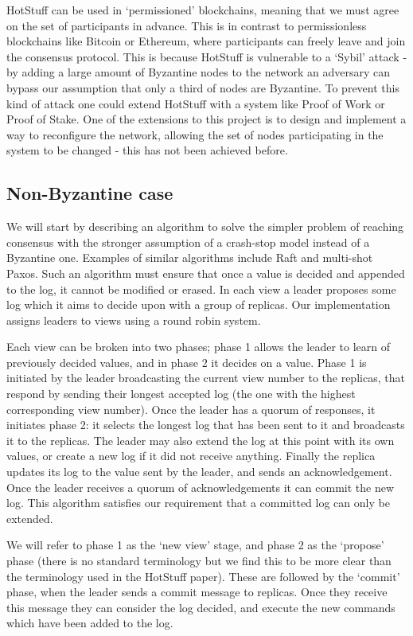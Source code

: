 \documentclass[a4paper]{article}
\begin{document}
HotStuff can be used in `permissioned' blockchains, meaning that we must agree on the set of participants in advance. This is in contrast to permissionless blockchains like Bitcoin or Ethereum, where participants can freely leave and join the consensus protocol. This is because HotStuff is vulnerable to a `Sybil' attack - by adding a large amount of Byzantine nodes to the network an adversary can bypass our assumption that only a third of nodes are Byzantine. To prevent this kind of attack one could extend HotStuff with a system like Proof of Work or Proof of Stake. One of the extensions to this project is to design and implement a way to reconfigure the network, allowing the set of nodes participating in the system to be changed - this has not been achieved before.

\subsection{Non-Byzantine case}
We will start by describing an algorithm to solve the simpler problem of reaching consensus with the stronger assumption of a crash-stop model instead of a Byzantine one. Examples of similar algorithms include Raft and multi-shot Paxos. Such an algorithm must ensure that once a value is decided and appended to the log, it cannot be modified or erased. In each view a leader proposes some log which it aims to decide upon with a group of replicas. Our implementation assigns leaders to views using a round robin system.

Each view can be broken into two phases; phase 1 allows the leader to learn of previously decided values, and in phase 2 it decides on a value. Phase 1 is initiated by the leader broadcasting the current view number to the replicas, that respond by sending their longest accepted log (the one with the highest corresponding view number). Once the leader has a quorum of responses, it initiates phase 2: it selects the longest log that has been sent to it and broadcasts it to the replicas. The leader may also extend the log at this point with its own values, or create a new log if it did not receive anything. Finally the replica updates its log to the value sent by the leader, and sends an acknowledgement. Once the leader receives a quorum of acknowledgements it can commit the new log. This algorithm satisfies our requirement that a committed log can only be extended.

We will refer to phase 1 as the `new view' stage, and phase 2 as the `propose' phase (there is no standard terminology but we find this to be more clear than the terminology used in the HotStuff paper). These are followed by the `commit' phase, when the leader sends a commit message to replicas. Once they receive this message they can consider the log decided, and execute the new commands which have been added to the log.
\end{document}
